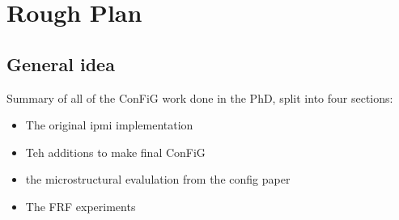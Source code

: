 \chapter{Rough Plan	}
\label{sec:plan}

\section{General idea}
Summary of all of the ConFiG work done in the PhD, split into four sections:
\begin{itemize}
\item The original ipmi implementation
\item Teh additions to make final ConFiG
\item the microstructural evalulation from the config paper
\item The FRF experiments
\end{itemize}


